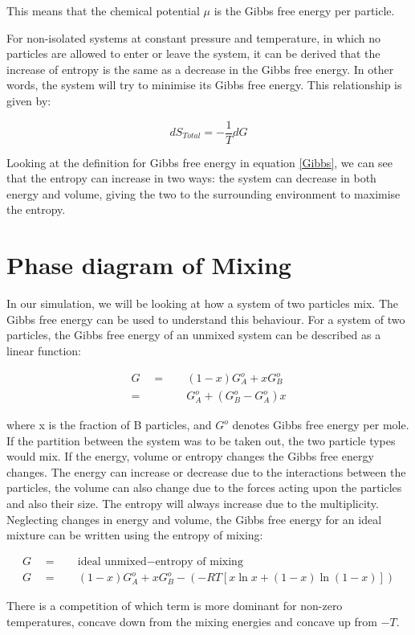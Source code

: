 \documentclass[../hand-in3.tex]{subfiles}
\begin{document}
This means that the chemical potential $\mu$ is the Gibbs free energy per particle.

For non-isolated systems at constant pressure and temperature, in which no particles are allowed to enter or leave the system, it can be derived that the increase of entropy is the same as a decrease in the Gibbs free energy. In other words, the system will try to minimise its Gibbs free energy. This relationship is given by:

\begin{equation}
dS_{Total} = - \frac{1}{T} dG
\end{equation}

Looking at the definition for Gibbs free energy in equation \ref{Gibbs}, we can see that the entropy can increase in two ways: the system can decrease in both energy and volume, giving the two to the surrounding environment to maximise the entropy.

\section{Phase diagram of Mixing}

In our simulation, we will be looking at how a system of two particles mix. The Gibbs free energy can be used to understand this behaviour. For a system of two particles, the Gibbs free energy of an unmixed system can be described as a linear function:

\begin{align}
G \quad =& \quad (1-x)G_A^o + xG_B^o \\
  =& \quad G_A^o + (G_B^o- G_A^o)x	
\end{align}   

where x is the fraction of B particles, and $G^o$ denotes Gibbs free energy per mole. If the partition between the system was to be taken out, the two particle types would mix. If the energy, volume or entropy changes the Gibbs free energy changes. The energy can increase or decrease due to the interactions between the particles, the volume can also change due to the forces acting upon the particles and also their size. The entropy will always increase due to the multiplicity. Neglecting changes in energy and volume, the Gibbs free energy for an ideal mixture can be written using the entropy of mixing:

\begin{align}
G \quad =& \quad \text{ideal unmixed} - \text{entropy of mixing}\\ 
G \quad =& \quad (1-x)G_A^o + xG_B^o - \left(- RT \left[ x \ln x + (1-x) \ln (1-x) \right] \right)
\end{align} 

There is a competition of which term is more dominant for non-zero temperatures, concave down from the mixing energies and concave up from $-T$.
\end{document}

